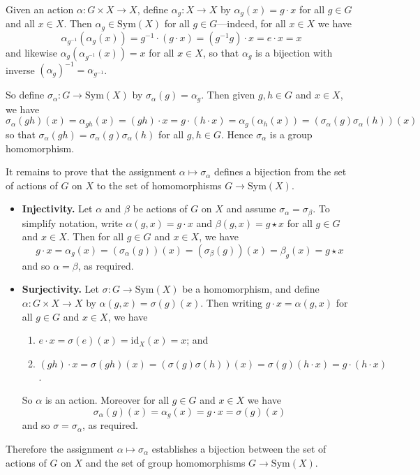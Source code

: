 \begin{cproof}
Given an action $\alpha : G \times X \to X$, define $\alpha_g : X \to X$ by $\alpha_g(x) = g \cdot x$ for all $g \in G$ and all $x \in X$. Then $\alpha_g \in \mathrm{Sym}(X)$ for all $g \in G$---indeed, for all $x \in X$ we have
\[ \alpha_{g^{-1}}(\alpha_g(x)) = g^{-1} \cdot (g \cdot x) = (g^{-1}g) \cdot x = e \cdot x = x \]
and likewise $\alpha_g(\alpha_{g^{-1}}(x)) = x$ for all $x \in X$, so that $\alpha_g$ is a bijection with inverse $(\alpha_g)^{-1} = \alpha_{g^{-1}}$.

So define $\sigma_{\alpha} : G \to \mathrm{Sym}(X)$ by $\sigma_{\alpha}(g) = \alpha_g$. Then given $g,h \in G$ and $x \in X$, we have
\[ \sigma_{\alpha}(gh)(x) = \alpha_{gh}(x) = (gh) \cdot x = g \cdot (h \cdot x) = \alpha_g(\alpha_h(x)) = (\sigma_{\alpha}(g) \sigma_{\alpha}(h)) (x) \]
so that $\sigma_{\alpha}(gh) = \sigma_{\alpha}(g)\sigma_{\alpha}(h)$ for all $g,h \in G$. Hence $\sigma_{\alpha}$ is a group homomorphism.

It remains to prove that the assignment $\alpha \mapsto \sigma_{\alpha}$ defines a bijection from the set of actions of $G$ on $X$ to the set of homomorphisms $G \to \mathrm{Sym}(X)$.

\begin{itemize}
\item \textbf{Injectivity.} Let $\alpha$ and $\beta$ be actions of $G$ on $X$ and assume $\sigma_{\alpha} = \sigma_{\beta}$. To simplify notation, write $\alpha(g,x) = g \cdot x$ and $\beta(g,x) = g \star x$ for all $g \in G$ and $x \in X$. Then for all $g \in G$ and $x \in X$, we have
\[ g \cdot x = \alpha_g(x) = (\sigma_{\alpha}(g))(x) = (\sigma_{\beta}(g))(x) = \beta_g(x) = g \star x \]
and so $\alpha = \beta$, as required.

\item \textbf{Surjectivity.} Let $\sigma : G \to \mathrm{Sym}(X)$ be a homomorphism, and define $\alpha : G \times X \to X$ by $\alpha(g,x) = \sigma(g)(x)$. Then writing $g \cdot x = \alpha(g,x)$ for all $g \in G$ and $x \in X$, we have
\begin{enumerate}
\item $e \cdot x = \sigma(e)(x) = \mathrm{id}_X(x) = x$; and
\item $(gh) \cdot x = \sigma(gh)(x) = (\sigma(g)\sigma(h))(x) = \sigma(g)(h \cdot x) = g \cdot (h \cdot x)$.
\end{enumerate}
So $\alpha$ is an action. Moreover for all $g \in G$ and $x \in X$ we have
\[ \sigma_{\alpha}(g)(x) = \alpha_g(x) = g \cdot x = \sigma(g)(x) \]
and so $\sigma = \sigma_{\alpha}$, as required.
\end{itemize}

Therefore the assignment $\alpha \mapsto \sigma_{\alpha}$ establishes a bijection between the set of actions of $G$ on $X$ and the set of group homomorphisms $G \to \mathrm{Sym}(X)$.
\end{cproof}

